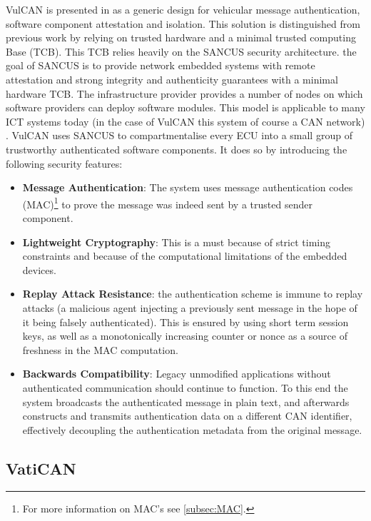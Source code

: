 VulCAN is presented in \cite{VulCAN} as a generic design for vehicular message authentication, software component attestation and isolation. This solution is distinguished from previous work by relying on trusted hardware and a minimal trusted computing Base (TCB). This TCB relies heavily on the SANCUS security architecture. the goal of SANCUS is to provide network embedded systems with remote attestation and strong integrity and authenticity guarantees with a minimal hardware TCB. The infrastructure provider provides a number of nodes on which software providers can deploy software modules. This model is applicable to many ICT systems today (in the case of VulCAN this system of course a CAN network) \cite{Sancus}. VulCAN uses SANCUS to compartmentalise every ECU into a small group of trustworthy authenticated software components. It does so by introducing the following security features: 

\begin{itemize}
	\item \textbf{Message Authentication}: The system uses message authentication codes (MAC)\footnote{For more information on MAC's see \ref{subsec:MAC}.} to prove the message was indeed sent by a trusted sender component.
	
	\item \textbf{Lightweight Cryptography}: This is a must because of strict timing constraints and because of the computational limitations of the embedded devices. 
	
	\item \textbf{Replay Attack Resistance}: the authentication scheme is immune to replay attacks (a malicious agent injecting a previously sent message in the hope of it being falsely authenticated). This is ensured by using short term session keys, as well as a monotonically increasing counter or nonce as a source of freshness in the MAC computation.
	
	\item \textbf{Backwards Compatibility}: Legacy unmodified applications without authenticated communication should continue to function. To this end the system broadcasts the authenticated message in plain text, and afterwards constructs and transmits authentication data on a different CAN identifier, effectively decoupling the authentication metadata from the original message.
\end{itemize}

\subsection{VatiCAN} 
\label{subsec:vatican}

